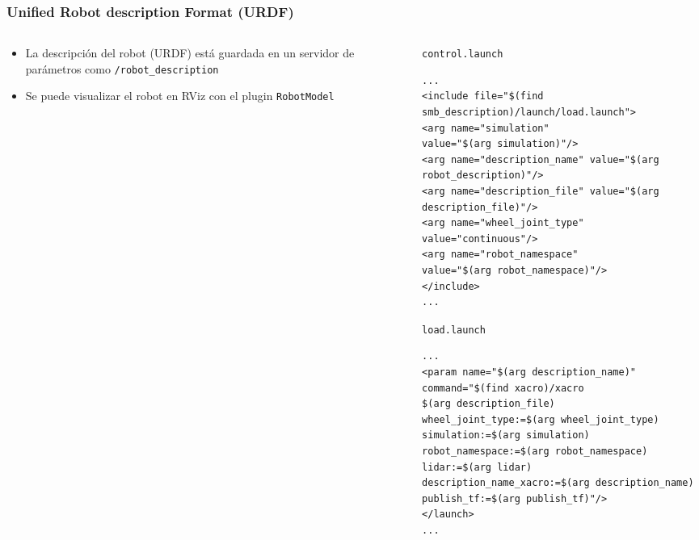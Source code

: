\begin{frame}[fragile]
    \frametitle{Unified Robot description Format (URDF)}
    
\footnotesize

\begin{columns}
\begin{column}{0.4\textwidth}
\begin{itemize}
\item La descripción del robot (URDF) está guardada en un servidor de parámetros como \lstinline[style=bash]{/robot_description}
\item Se puede visualizar el robot en RViz con el plugin \lstinline[style=bash]{RobotModel}
\end{itemize}
\end{column}
\begin{column}{0.6\textwidth}

\lstinline[style=bash]{control.launch}
\begin{lstlisting}[style=xml,basicstyle=\tiny]
...
<include file="$(find smb_description)/launch/load.launch">
<arg name="simulation"
value="$(arg simulation)"/>
<arg name="description_name" value="$(arg robot_description)"/>
<arg name="description_file" value="$(arg description_file)"/>
<arg name="wheel_joint_type" value="continuous"/>
<arg name="robot_namespace"
value="$(arg robot_namespace)"/>
</include>
...
\end{lstlisting}

\lstinline[style=bash]{load.launch}
\begin{lstlisting}[style=xml,basicstyle=\tiny]
...
<param name="$(arg description_name)" command="$(find xacro)/xacro
$(arg description_file)
wheel_joint_type:=$(arg wheel_joint_type)
simulation:=$(arg simulation)
robot_namespace:=$(arg robot_namespace)
lidar:=$(arg lidar)
description_name_xacro:=$(arg description_name)
publish_tf:=$(arg publish_tf)"/>
</launch>
...
\end{lstlisting}
	
\end{column}
\end{columns}

\end{frame}

